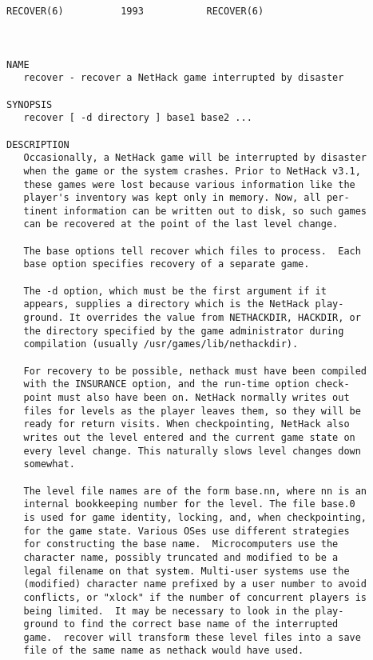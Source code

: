\documentclass[11pt]{article}
\begin{document}
\begin{verbatim}



RECOVER(6)          1993           RECOVER(6)



NAME
   recover - recover a NetHack game interrupted by disaster

SYNOPSIS
   recover [ -d directory ] base1 base2 ...

DESCRIPTION
   Occasionally, a NetHack game will be interrupted by disaster
   when the game or the system crashes. Prior to NetHack v3.1,
   these games were lost because various information like the
   player's inventory was kept only in memory. Now, all per-
   tinent information can be written out to disk, so such games
   can be recovered at the point of the last level change.

   The base options tell recover which files to process.  Each
   base option specifies recovery of a separate game.

   The -d option, which must be the first argument if it
   appears, supplies a directory which is the NetHack play-
   ground. It overrides the value from NETHACKDIR, HACKDIR, or
   the directory specified by the game administrator during
   compilation (usually /usr/games/lib/nethackdir).

   For recovery to be possible, nethack must have been compiled
   with the INSURANCE option, and the run-time option check-
   point must also have been on. NetHack normally writes out
   files for levels as the player leaves them, so they will be
   ready for return visits. When checkpointing, NetHack also
   writes out the level entered and the current game state on
   every level change. This naturally slows level changes down
   somewhat.

   The level file names are of the form base.nn, where nn is an
   internal bookkeeping number for the level. The file base.0
   is used for game identity, locking, and, when checkpointing,
   for the game state. Various OSes use different strategies
   for constructing the base name.  Microcomputers use the
   character name, possibly truncated and modified to be a
   legal filename on that system. Multi-user systems use the
   (modified) character name prefixed by a user number to avoid
   conflicts, or "xlock" if the number of concurrent players is
   being limited.  It may be necessary to look in the play-
   ground to find the correct base name of the interrupted
   game.  recover will transform these level files into a save
   file of the same name as nethack would have used.


\end{verbatim}
\end{document}
